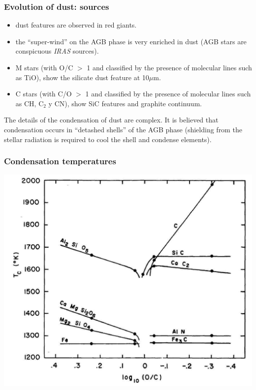 \begin{frame}\frametitle{Evolution of dust: sources}

\begin{itemize}
\item dust features are observed in red giants.
\item the ``super-wind'' on the AGB phase is very enriched in dust
(AGB stars are conspicuous {\em IRAS} sources).
\item M stars (with O/C $>$ 1 and classified by the presence of molecular lines such as TiO),
show the silicate dust feature at  10$\mu$m.
\item C stars  (with C/O $>$ 1 and classified by the presence of
molecular lines such as CH, C$_2$ y CN), show SiC features and
graphite continuum.
\end{itemize}

The details of the condensation of dust are complex. It is believed
that condensation occurs in ``detashed shells'' of the AGB phase
(shielding from the stellar radiation is required to cool the shell
and condense elements).

\end{frame}
\begin{frame}\frametitle{Condensation
temperatures} 

\begin{center}
\includegraphics[width=!,height=0.8\textwidth]{./D/Tcond_gilman.jpg}
\end{center}

\end{frame}
